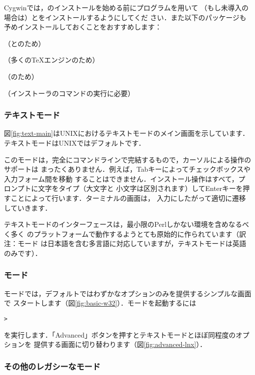 \documentclass[uplatex,dvipdfmx]{jsarticle}
\begin{document}
Cygwinでは，\TL のインストールを始める前にプログラムを用いて
（もし未導入の場合は）とをインストールするようにしてくだ
さい．また以下のパッケージも予めインストールしておくことをおすすめします：
%
\begin{itemize*}
\item {}（\XeTeX と\LuaTeX のため）
\item {}（多くの\TeX エンジンのため）
\item {}（のため）
\item {}（インストーラのコマンドの実行に必要）
\end{itemize*}

\subsubsection{テキストモード}

図\ref{fig:text-main}はUNIXにおけるテキストモードのメイン画面を示しています．
テキストモードはUNIXではデフォルトです．

このモードは，完全にコマンドラインで完結するもので，カーソルによる操作のサポートは
まったくありません．例えば，Tabキーによってチェックボックスや入力フォーム間を移動
することはできません．インストール操作はすべて，プロンプトに文字をタイプ（大文字と
小文字は区別されます）してEnterキーを押すことによって行います．ターミナルの画面は，
入力にしたがって適切に遷移していきます．

テキストモードのインターフェースは，最小限のPerlしかない環境を含めなるべく多く
のプラットフォームで動作するようとても原始的に作られています（訳注：\GUI モード
は日本語を含む多言語に対応していますが，テキストモードは英語のみです）．

\subsubsection{\GUI モード}
\label{sec:graphical-inst}

\GUI モードでは，デフォルトではわずかなオプションのみを提供するシンプルな画面で
スタートします（図\ref{fig:basic-w32}）．\GUI モードを起動するには
%
\begin{alltt}
> 
\end{alltt}
%
を実行します．「Advanced」ボタンを押すとテキストモードとほぼ同程度のオプションを
提供する画面に切り替わります（図\ref{fig:advanced-lnx}）．

\subsubsection{その他のレガシーなモード}
\end{document}
